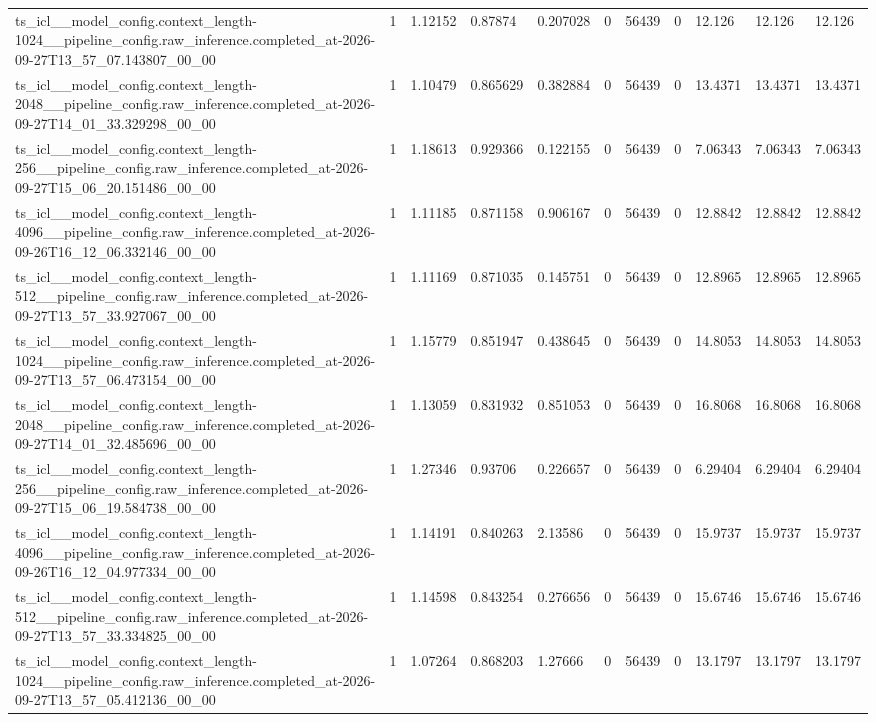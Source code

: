 \begin{tabular}{lllllllllll}
ts\_icl\_\_model\_config.context\_length-1024\_\_pipeline\_config.raw\_inference.completed\_at-2026-09-27T13\_57\_07.143807\_00\_00 & 1 & 1.12152 & 0.87874 & 0.207028 & 0 & 56439 & 0 & 12.126 & 12.126 & 12.126 \\
ts\_icl\_\_model\_config.context\_length-2048\_\_pipeline\_config.raw\_inference.completed\_at-2026-09-27T14\_01\_33.329298\_00\_00 & 1 & 1.10479 & 0.865629 & 0.382884 & 0 & 56439 & 0 & 13.4371 & 13.4371 & 13.4371 \\
ts\_icl\_\_model\_config.context\_length-256\_\_pipeline\_config.raw\_inference.completed\_at-2026-09-27T15\_06\_20.151486\_00\_00 & 1 & 1.18613 & 0.929366 & 0.122155 & 0 & 56439 & 0 & 7.06343 & 7.06343 & 7.06343 \\
ts\_icl\_\_model\_config.context\_length-4096\_\_pipeline\_config.raw\_inference.completed\_at-2026-09-26T16\_12\_06.332146\_00\_00 & 1 & 1.11185 & 0.871158 & 0.906167 & 0 & 56439 & 0 & 12.8842 & 12.8842 & 12.8842 \\
ts\_icl\_\_model\_config.context\_length-512\_\_pipeline\_config.raw\_inference.completed\_at-2026-09-27T13\_57\_33.927067\_00\_00 & 1 & 1.11169 & 0.871035 & 0.145751 & 0 & 56439 & 0 & 12.8965 & 12.8965 & 12.8965 \\
ts\_icl\_\_model\_config.context\_length-1024\_\_pipeline\_config.raw\_inference.completed\_at-2026-09-27T13\_57\_06.473154\_00\_00 & 1 & 1.15779 & 0.851947 & 0.438645 & 0 & 56439 & 0 & 14.8053 & 14.8053 & 14.8053 \\
ts\_icl\_\_model\_config.context\_length-2048\_\_pipeline\_config.raw\_inference.completed\_at-2026-09-27T14\_01\_32.485696\_00\_00 & 1 & 1.13059 & 0.831932 & 0.851053 & 0 & 56439 & 0 & 16.8068 & 16.8068 & 16.8068 \\
ts\_icl\_\_model\_config.context\_length-256\_\_pipeline\_config.raw\_inference.completed\_at-2026-09-27T15\_06\_19.584738\_00\_00 & 1 & 1.27346 & 0.93706 & 0.226657 & 0 & 56439 & 0 & 6.29404 & 6.29404 & 6.29404 \\
ts\_icl\_\_model\_config.context\_length-4096\_\_pipeline\_config.raw\_inference.completed\_at-2026-09-26T16\_12\_04.977334\_00\_00 & 1 & 1.14191 & 0.840263 & 2.13586 & 0 & 56439 & 0 & 15.9737 & 15.9737 & 15.9737 \\
ts\_icl\_\_model\_config.context\_length-512\_\_pipeline\_config.raw\_inference.completed\_at-2026-09-27T13\_57\_33.334825\_00\_00 & 1 & 1.14598 & 0.843254 & 0.276656 & 0 & 56439 & 0 & 15.6746 & 15.6746 & 15.6746 \\
ts\_icl\_\_model\_config.context\_length-1024\_\_pipeline\_config.raw\_inference.completed\_at-2026-09-27T13\_57\_05.412136\_00\_00 & 1 & 1.07264 & 0.868203 & 1.27666 & 0 & 56439 & 0 & 13.1797 & 13.1797 & 13.1797 \\

\end{tabular}
